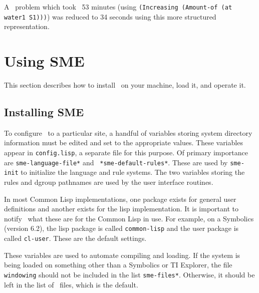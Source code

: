\noindent
A \Phineas\ problem which took \SME\ 53 minutes (using {\tt (Increasing
(Amount-of (at water1 S1)))}) was reduced to 34 seconds using this more
structured representation.


\section{Using SME}

This section describes how to install \SME\ on your machine, load it, and
operate it.

\subsection{Installing SME}\label{ss:site-specifics}

\indent
{}

To configure \SME\ to a particular site, a handful of variables storing
system directory information must be edited and set to the appropriate
values. These variables appear in {\tt config.lisp}, a separate file for
this purpose. Of primary importance are {\tt *sme-language-file*} and {\tt
*sme-default-rules*}. These are used by {\tt sme-init} to initialize the
language and rule systems. The two variables storing the rules and dgroup
pathnames are used by the user interface routines.


In most Common Lisp implementations, one package exists for general user
definitions and another exists for the lisp implementation. It is important
to notify \SME\ what these are for the Common Lisp in use. For example, on a
Symbolics (version 6.2), the lisp package is called {\tt common-lisp} and
the user package is called {\tt cl-user}. These are the default settings.


These variables are used to automate compiling and loading. If the system is
being loaded on something other than a Symbolics or TI Explorer, the file
{\tt windowing} should not be included in the list {\tt *sme-files*}.
Otherwise, it should be left in the list of \SME\ files, which is the
default.

